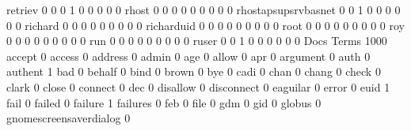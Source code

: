 \documentclass[compress,8pt]{beamer}
\begin{document}
\begin{frame}
\begin{Schunk}
  retriev                                    0   0   0   1   0   0   0   0   0
  rhost                                      0   0   0   0   0   0   0   0   0
  rhostapsupsrvbasnet                        0   0   1   0   0   0   0   0   0
  richard                                    0   0   0   0   0   0   0   0   0
  richarduid                                 0   0   0   0   0   0   0   0   0
  root                                       0   0   0   0   0   0   0   0   0
  roy                                        0   0   0   0   0   0   0   0   0
  run                                        0   0   0   0   0   0   0   0   0
  ruser                                      0   0   1   0   0   0   0   0   0
                                          Docs
Terms                                      1000
  accept                                      0
  access                                      0
  address                                     0
  admin                                       0
  age                                         0
  allow                                       0
  apr                                         0
  argument                                    0
  auth                                        0
  authent                                     1
  bad                                         0
  behalf                                      0
  bind                                        0
  brown                                       0
  bye                                         0
  cadi                                        0
  chan                                        0
  chang                                       0
  check                                       0
  clark                                       0
  close                                       0
  connect                                     0
  dec                                         0
  disallow                                    0
  disconnect                                  0
  eaguilar                                    0
  error                                       0
  euid                                        1
  fail                                        0
  failed                                      0
  failure                                     1
  failures                                    0
  feb                                         0
  file                                        0
  gdm                                         0
  gid                                         0
  globus                                      0
  gnomescreensaverdialog                      0

\end{Schunk}
\end{frame}
\end{document}
